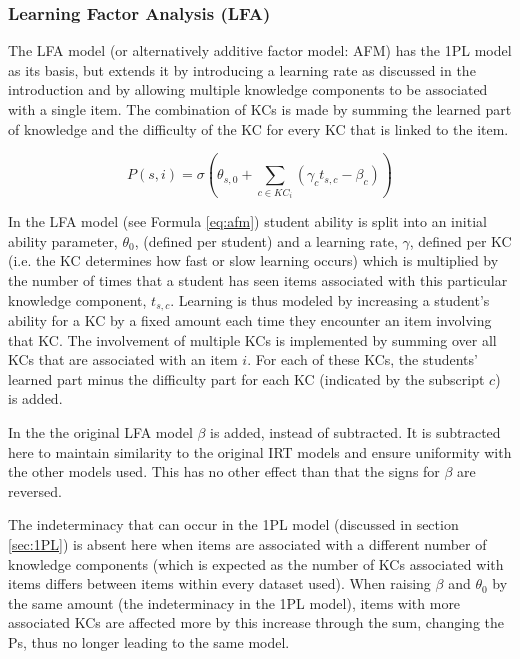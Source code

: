 \documentclass{scrartcl}
\begin{document}
\subsubsection{Learning Factor Analysis (LFA)}
\label{sec:AFM}
The LFA model (or alternatively additive factor model: AFM) has the 1PL model as its basis, but extends it by introducing a learning rate as discussed in the introduction and by allowing multiple knowledge components to be associated with a single item. The combination of KCs is made by summing the learned part of knowledge and the difficulty of the KC for every KC that is linked to the item.

\begin{equation}
\label{eq:afm}
P(s,i) = \sigma(\theta_{s,0} + \sum_{c \in KC_{i}}(\gamma_{c} t_{s,c} - \beta_{c}))
\end{equation}

In the LFA model (see Formula \ref{eq:afm}) student ability is split into an initial ability parameter, $\theta_{0}$, (defined per student) and a learning rate, $\gamma$, defined per KC (i.e. the KC determines how fast or slow learning occurs) which is  multiplied by the number of times that a student has seen items associated with this particular knowledge component, $t_{s,c}$. Learning is thus modeled by increasing a student's ability for a KC by a fixed amount each time they encounter an item involving that KC. The involvement of multiple KCs is implemented by summing over all KCs that are associated with an item $i$. For each of these KCs, the students' learned part minus the difficulty part for each KC (indicated by the subscript $c$) is added.  

In the the original LFA model $\beta$ is added, instead of subtracted. It is subtracted here to maintain similarity to the original IRT models and ensure uniformity with the other models used. This has no other effect than that the signs for $\beta$ are reversed.

The indeterminacy that can occur in the 1PL model (discussed in section \ref{sec:1PL}) is absent here when items are associated with a different number of knowledge components (which is expected as the number of KCs associated with items differs between items within every dataset used). When raising $\beta$ and $\theta_{0}$ by the same amount (the indeterminacy in the 1PL model), items with more associated KCs are affected more by this increase through the sum, changing the Ps, thus no longer leading to the same model. 
\end{document}
